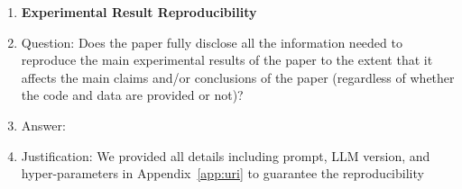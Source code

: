 \begin{enumerate}
    \item {\bf Experimental Result Reproducibility}
    \item[] Question: Does the paper fully disclose all the information needed to reproduce the main experimental results of the paper to the extent that it affects the main claims and/or conclusions of the paper (regardless of whether the code and data are provided or not)?
    \item[] Answer: \answerYes{} %
    \item[] Justification: We provided all details including prompt, LLM version, and hyper-parameters in Appendix~\ref{app:uri} to guarantee the reproducibility

\end{enumerate}
